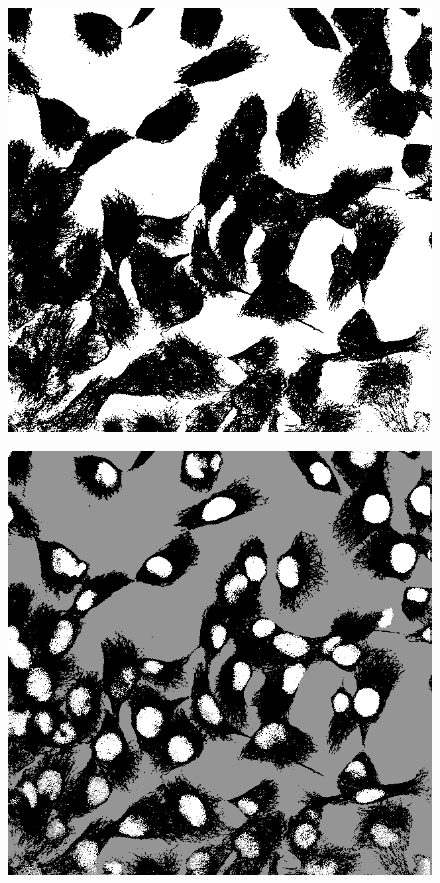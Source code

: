 \documentclass[a4paper]{article}
\begin{document}
\begin{figure}[p]
\begin{minipage}{0.32\textwidth}
\centering
\includegraphics[width=1\textwidth]{km2}
\label{fig:km2}
\end{minipage}%
\begin{minipage}{0.32\textwidth}
\centering
\includegraphics[width=1\textwidth]{km3}

\end{minipage}
\end{figure}
\end{document}
